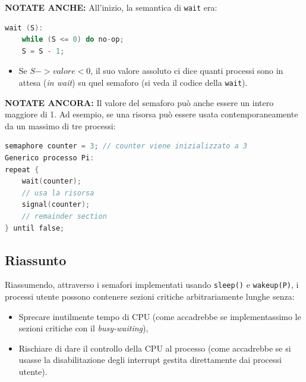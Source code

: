 
\textbf{NOTATE ANCHE:} All'inizio, la semantica di \texttt{wait} era:
\begin{lstlisting}[language=C]
wait (S): 
    while (S <= 0) do no-op;
    S = S - 1;
\end{lstlisting}
\begin{itemize}
    \item Se $S->valore < 0$, il suo valore assoluto ci dice quanti processi sono in attesa (\textit{in wait}) su quel semaforo (si veda il codice della \texttt{wait}).
\end{itemize}
\textbf{NOTATE ANCORA:} Il valore del semaforo può anche essere un intero maggiore di 1. Ad esempio, se una risorsa può essere usata contemporaneamente da un massimo di tre processi:
\begin{lstlisting}[language=C]
semaphore counter = 3; // counter viene inizializzato a 3
Generico processo Pi:
repeat {
    wait(counter);
    // usa la risorsa
    signal(counter);
    // remainder section
} until false;
\end{lstlisting}        
\subsection{Riassunto}
Riassumendo, attraverso i semafori implementati usando \texttt{sleep()} e \texttt{wakeup(P)}, i processi utente possono contenere sezioni critiche arbitrariamente lunghe senza:
\begin{itemize}
    \item Sprecare inutilmente tempo di CPU (come accadrebbe se implementassimo le sezioni critiche con il \textit{busy-waiting}),
    \item Rischiare di dare il controllo della CPU al processo (come accadrebbe se si usasse la disabilitazione degli interrupt gestita direttamente dai processi utente).
\end{itemize}



